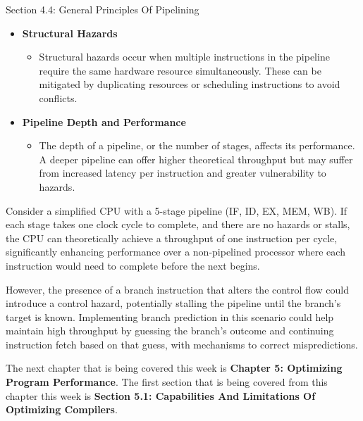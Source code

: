 \begin{notes}{Section 4.4: General Principles Of Pipelining}
\begin{itemize}
\begin{itemize}
        \end{itemize}
        \item \textbf{Structural Hazards}
        \begin{itemize}
            \item Structural hazards occur when multiple instructions in the pipeline require the same hardware resource simultaneously. These can be mitigated by duplicating resources or scheduling 
            instructions to avoid conflicts.
        \end{itemize}
        \item \textbf{Pipeline Depth and Performance}
        \begin{itemize}
            \item The depth of a pipeline, or the number of stages, affects its performance. A deeper pipeline can offer higher theoretical throughput but may suffer from increased latency per 
            instruction and greater vulnerability to hazards.
        \end{itemize}
    \end{itemize}
    
    \begin{highlight}
        Consider a simplified CPU with a 5-stage pipeline (IF, ID, EX, MEM, WB). If each stage takes one clock cycle to complete, and there are no hazards or stalls, the CPU can theoretically achieve 
        a throughput of one instruction per cycle, significantly enhancing performance over a non-pipelined processor where each instruction would need to complete before the next begins.
    
        However, the presence of a branch instruction that alters the control flow could introduce a control hazard, potentially stalling the pipeline until the branch's target is known. Implementing 
        branch prediction in this scenario could help maintain high throughput by guessing the branch's outcome and continuing instruction fetch based on that guess, with mechanisms to correct mispredictions.
    \end{highlight}    
\end{notes}

The next chapter that is being covered this week is \textbf{Chapter 5: Optimizing Program Performance}. The first section that is being covered from this chapter this week is \textbf{Section 5.1: Capabilities And Limitations Of Optimizing Compilers}.

